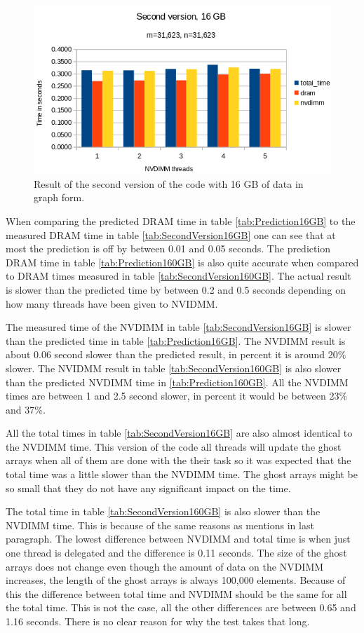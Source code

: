 \documentclass[12pt,a4paper,USenglish]{article}      %
\begin{document}
\begin{figure}[!hbtp]
\includegraphics[scale=0.7]{Large_Array_test/Second_version_16GB.png}
\caption{Result of the second version of the code with 16 GB of data in graph form.}
\label{fig:SecondVersion16GB}
\end{figure}

When comparing the predicted DRAM time in table \ref{tab:Prediction16GB} to the measured DRAM time in table \ref{tab:SecondVersion16GB} one can see that at most the prediction is off by between 0.01 and 0.05 seconds.
The prediction DRAM time in table \ref{tab:Prediction160GB} is also quite accurate when compared to DRAM times measured in table \ref{tab:SecondVersion160GB}. The actual result is slower than the predicted time by between 0.2 and 0.5 seconds depending on how many threads have been given to NVIDMM.

The measured time of the NVDIMM in table \ref{tab:SecondVersion16GB} is slower than the predicted time in table \ref{tab:Prediction16GB}. The NVDIMM result is about 0.06 second slower than the predicted result, in percent it is around 20\% slower. 
The NVIDMM result in table \ref{tab:SecondVersion160GB} is also slower than the predicted NVDIMM time in \ref{tab:Prediction160GB}. All the NVDIMM times are between 1 and 2.5 second slower, in percent it would be between 23\% and 37\%.

All the total times in table \ref{tab:SecondVersion16GB} are also almost identical to the NVDIMM time. This version of the code all threads will update the ghost arrays when all of them are done with the their task so it was expected that the total time was a little slower than the NVDIMM time. The ghost arrays might be so small that they do not have any significant impact on the time.

The total time in table \ref{tab:SecondVersion160GB} is also slower than the NVDIMM time. This is because of the same reasons as mentions in last paragraph. The lowest difference between NVDIMM and total time is when just one thread is delegated and the difference is 0.11 seconds. The size of the ghost arrays does not change even though the amount of data on the NVDIMM increases, the length of the ghost arrays is always 100,000 elements. Because of this the difference between total time and NVDIMM should be the same for all the total time. This is not the case, all the other differences are between 0.65 and 1.16 seconds. There is no clear reason for why the test takes that long.
\end{document}
